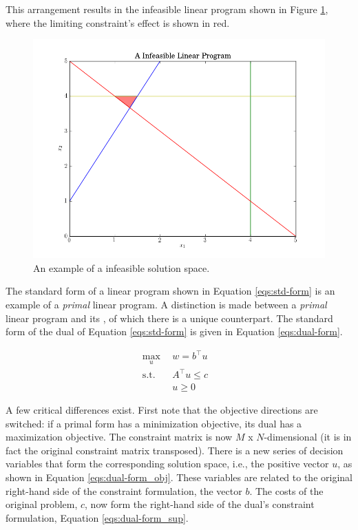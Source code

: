 This arrangement results in the infeasible linear program shown in
Figure \ref{fig:infeasible}, where the limiting constraint's effect is shown in
red.

\begin{figure}[H]
  \begin{center}
    \includegraphics[width=\linewidth]{./chapters/litreview/plots/infeasible.png}
  \caption{An example of a infeasible solution space.}
  \label{fig:infeasible}
  \end{center}
\end{figure}

The standard form of a linear program shown in Equation \ref{eqs:std-form} is an
example of a \textit{primal} linear program. A distinction is made between
a \textit{primal} linear program and its , of which there is a unique
counterpart. The standard form of the dual of Equation \ref{eqs:std-form} is
given in Equation \ref{eqs:dual-form}.

\begin{subequations}\label{eqs:dual-form}
  \begin{align}
    \max_{u} \:\: & 
    w = b^{\top} u
    & \label{eqs:dual-form_obj} \\
    \text{s.t.} \:\: &
    A^{\top} u \leq c 
    & \label{eqs:dual-form_sup} \\
    &
    u \geq 0
    &\label{eqs:dual-form_x}
  \end{align}
\end{subequations}

A few critical differences exist. First note that the objective directions are
switched: if a primal form has a minimization objective, its dual has a
maximization objective. The constraint matrix is now $M$ x $N$-dimensional (it
is in fact the original constraint matrix transposed). There is a new series of
decision variables that form the corresponding solution space, i.e., the
positive vector $u$, as shown in Equation \ref{eqs:dual-form_obj}. These
variables are related to the original right-hand side of the constraint
formulation, the vector $b$. The costs of the original problem, $c$, now form
the right-hand side of the dual's constraint formulation,
Equation \ref{eqs:dual-form_sup}.

